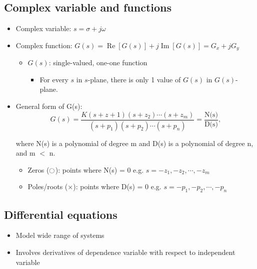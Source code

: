 \documentclass[a4paper]{article}
\begin{document}
\subsection{Complex variable and functions}
\begin{itemize}
    \item Complex variable: $s = \sigma + j\omega$
    \item Complex function: $G(s) = \operatorname{Re}[G(s)] + j\operatorname{Im}[G(s)] = G_{x}+jG_{y}$
    \begin{itemize}[label=$\circ$]
        \item $G(s)$: single-valued, one-one function
        \begin{itemize}[label=\tiny$\blacksquare$]
            \item For every $s$ in $s$-plane, there is only 1 value of $G(s)$ in $G(s)$-plane.
        \end{itemize}
    \end{itemize}
    \item General form of G(s): $$G(s) = \frac{K(s+z+1)(s+z_2)\cdots(s+z_m)}{(s+p_1)(s+p_2)\cdots(s+p_n)}=\frac{\text{N(s)}}{\text{D(s)}},$$
    \begin{center}
       where N(s) is a polynomial of degree m and D(s) is a polynomial of degree n, and m $<$ n.
    \end{center}
    \begin{itemize}[label=$\circ$]
        \item Zeros ($\ocircle$): points where N(s) = 0
        \quad e.g. $s=-z_1, -z_2,\cdots,-z_m$
        \item Poles/roots ($\times$): points where D(s) = 0 \quad e.g. $s=-p_1, -p_2, \cdots, -p_n$
    \end{itemize}
\end{itemize}
\subsection{Differential equations}
\begin{itemize}
    \item Model wide range of systems
    \item Involves derivatives of dependence variable with respect to independent variable
\end{itemize}
\mbox{}\\
\begin{center}
\end{center}
\end{document}
